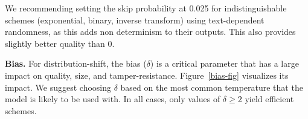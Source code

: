 

\smallskip{} 
We recommending setting the skip probability at 0.025 
for indistinguishable schemes (exponential, binary, inverse transform) 
using text-dependent randomness, 
as this adds non determinism to their outputs. 
This also provides slightly better quality than 0.



\smallskip\noindent\textbf{Bias.} 
For distribution-shift, the bias ($\delta$) is a critical parameter
that has a large impact on quality, size, and tamper-resistance.
Figure~\ref{bias-fig} visualizes its impact.
We suggest choosing $\delta$ based on the most common
temperature that the model is likely to be used with.
In all cases, only values of $\delta \geq 2$ yield efficient schemes.


